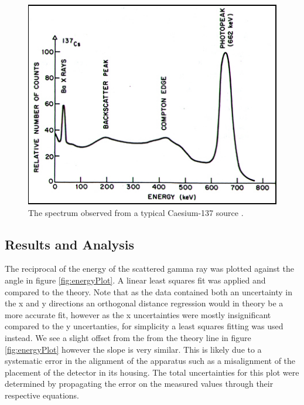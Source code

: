 \documentclass[%
reprint,
amsmath,amssymb,
aps,
]{revtex4-2}
\begin{document}
			\begin{figure}
				\includegraphics[width=0.85\columnwidth]{gammaspectrum.jpg}
				\caption{\label{fig:gammaSpectrum}The spectrum observed from a typical Caesium-137 source \cite{vcu}.}
			\end{figure}
		
		\subsection{Results and Analysis}
			The reciprocal of the energy of the scattered gamma ray was plotted against the angle in figure \ref{fig:energyPlot}. A linear least squares fit was applied and compared to the theory. Note that as the data contained both an uncertainty in the x and y directions an orthogonal distance regression would in theory be a more accurate fit, however as the x uncertainties were mostly insignificant compared to the y uncertanties, for simplicity a least squares fitting was used instead. We see a slight offset from the from the theory line in figure \ref{fig:energyPlot} however the slope is very similar. This is likely due to a systematic error in the alignment of the apparatus such as a misalignment of the placement of the detector in its housing. The total uncertainties for this plot were determined by propagating the error on the measured values through their respective equations.\\
			
\end{document}
